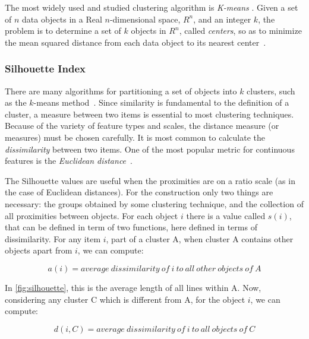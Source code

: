 \documentclass[conference,compsoc]{IEEEtran}
\begin{document}
The most widely used and studied clustering algorithm is \textit{K-means} \cite{kanungo2002efficient}. Given a set of $n$ data objects in a Real $n$-dimensional space, $R^n$, and an integer $k$, the problem is to determine a set of $k$ objects in $R^n$, called \textit{centers}, so as to minimize the mean squared distance from each data object to its nearest center~\cite{kanungo2002efficient}.


\subsubsection{Silhouette Index}
\label{sec:sillhouetteIndex}

There are many algorithms for partitioning a set of objects into $k$ clusters, such as the $k$-means method~\cite{kanungo2002efficient}. Since similarity is fundamental to the definition of a cluster, a measure between two items is essential to most clustering techniques. Because of the variety of feature types and scales, the distance measure (or measures) must be chosen carefully. It is most common to calculate the \textit{dissimilarity} between two items. One of the most popular metric for continuous features is the \textit{Euclidean distance}~\cite{jain1988algorithms}.

The Silhouette values are useful when the proximities are on a ratio scale (as in the case of Euclidean distances). For the construction only two things are necessary: the groups obtained by some clustering technique, and the collection of all proximities between objects. For each object $i$ there is a value called $s(i)$, that can be defined in term of two functions, here defined in terms of dissimilarity. For any item $i$, part of a cluster A, when cluster A contains other objects apart from $i$, we can compute:

\begin{equation} \label{eq:a_i}
a(i) = average~dissimilarity~of~i~to~all~other~objects~of~A
\end{equation}

In \ref{fig:silhouette}, this is the average length of all lines within A. Now, considering any cluster C which is different from A, for the object $i$, we can compute:

\begin{equation} \label{eq:d_i}
d(i, C) = average~dissimilarity~of~i~to~all~objects~of~C
\end{equation}
\end{document}

